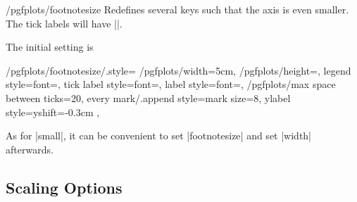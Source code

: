 \begin{stylekey}{/pgfplots/footnotesize}
	Redefines several keys such that the axis is even smaller. The tick labels will have |\footnotesize|.

\begin{codeexample}[]
\end{codeexample}
	The initial setting is
\begin{codeexample}
/pgfplots/footnotesize/.style={
	/pgfplots/width=5cm,
	/pgfplots/height=,
	legend style={font=\footnotesize},
	tick label style={font=\footnotesize},
	label style={font=\small},
	/pgfplots/max space between ticks=20,
	every mark/.append style={mark size=8},
	ylabel style={yshift=-0.3cm}
},
\end{codeexample}
As for |small|, it can be convenient to set |footnotesize| and set |width| afterwards.
\end{stylekey}

\subsection{Scaling Options}

